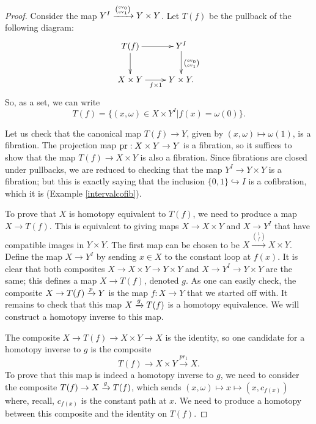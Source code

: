 \begin{proof}
    Consider the map $Y^I\xrightarrow{\binom{\mathrm{ev}_0}{\mathrm{ev}_1}}Y\times Y$.
    Let $T(f)$ be the pullback of the following diagram:
	\begin{equation*}
	    \xymatrix{
	T(f)\ar[r]\ar[d] & Y^I\ar[d]^{\binom{\ev_0}{\ev_1}}\\
		    X\times Y\ar[r]_{f\times 1} & Y\times Y.
		}
	\end{equation*}
	So, as a set, we can write
	$$T(f)=\{(x,\omega)\in X\times Y^I|f(x) = \omega(0)\}.$$

	Let us check that the canonical map $T(f) \to Y$, given by $(x,\omega) \mapsto \omega(1)$, is a fibration.
	The projection map $\mathrm{pr}: X\times Y\to Y$ is a fibration, so it suffices to show that the map $T(f) \to X\times Y$
	is also a fibration.
	Since fibrations are closed under pullbacks, we are reduced to checking that the map $Y^I\to Y\times Y$ is a fibration;
	but this is exactly saying that the inclusion $\{0,1\} \hookrightarrow I$ is a cofibration, which it is
	(Example \ref{intervalcofib}).

	To prove that $X$ is homotopy equivalent to $T(f)$, we need to produce a map $X\to T(f)$.
	This is equivalent to giving maps $X\to X\times Y$ and $X\to Y^I$ that have compatible images in $Y\times Y$.
	The first map can be chosen to be $X\xrightarrow{\binom{1}{f}}X\times Y$.
	Define the map $X\to Y^I$ by sending $x\in X$ to the constant loop at $f(x)$.
	It is clear that both composites $X\to X\times Y\to Y\times Y$ and $X\to Y^I\to Y\times Y$ are the same;
	this defines a map $X\to T(f)$, denoted $g$.
	As one can easily check, the composite $X\to T(f)\xrightarrow{{p}} Y$ is the map $f:X\to Y$ that we started off with.
	It remains to check that this map $X\xrightarrow{{g}} T(f)$ is a homotopy equivalence.
	We will construct a homotopy inverse to this map.

	The composite $X\to T(f)\to X\times Y\to X$ is the identity, so one candidate for a homotopy inverse to $g$ is
	the composite
	$$T(f)\to X\times Y\xrightarrow{pr_1} X.$$
	To prove that this map is indeed a homotopy inverse to $g$, we need to consider the composite
	$T(f)\to X\xrightarrow{{g}} T(f)$, which sends $(x,\omega)\mapsto x\mapsto (x,c_{f(x)})$ where,
	recall, $c_{f(x)}$ is the constant path at $x$.
	We need to produce a homotopy between this composite and the identity on $T(f)$.
	

\end{proof}
